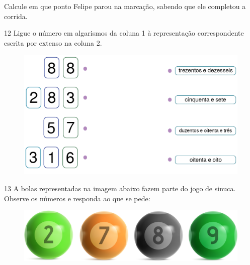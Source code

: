 \begin{escolha}
\item Calcule em que ponto Felipe parou na marcação, sabendo que ele completou a corrida.\\
\end{escolha}

\num{12} Ligue o número em algarismos da coluna 1 
à representação correspondente escrita por extenso na coluna 2.

\begin{figure}[htpb!]
\centering
\includegraphics[width=\textwidth]{./media/image5.png}
\end{figure}




\num{13} A bolas representadas na imagem abaixo fazem parte do jogo de sinuca. Observe os números e responda ao que se pede:

\begin{figure}[htpb!]
\centering
\includegraphics[width=.7\textwidth]{./media/image7.png}
\end{figure}


